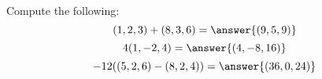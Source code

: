 \begin{problem}
Compute the following:
\[
(1,2,3)+(8,3,6)=\answer{(9,5,9)}
\]
\[
4(1,-2,4)=\answer{(4,-8,16)}
\]
\[
-12((5,2,6)-(8,2,4))=\answer{(36,0,24)}
\]
\end{problem}
